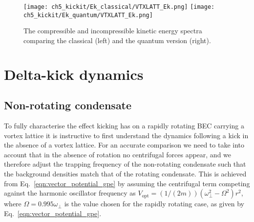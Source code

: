 \begin{figure}
    \centering
    \texttt{[image: ch5\_kickit/Ek\_classical/VTXLATT\_Ek.png]}
    \texttt{[image: ch5\_kickit/Ek\_quantum/VTXLATT\_Ek.png]}
\iffalse
    \texttt{[image: ch5\_kickit/Ek\_classical/VTXLATT\_Comp.png]}
    \texttt{[image: ch5\_kickit/Ek\_quantum/VTXLATT\_Comp.png]}

    \texttt{[image: ch5\_kickit/Ek\_classical/VTXLATT\_Incomp.png]}
    \texttt{[image: ch5\_kickit/Ek\_quantum/VTXLATT\_Incomp.png]}

    \caption[Kinetic energy spectra with and without quantum phase.]{The kinetic energy spectra (top row), compressible (middle row), and incompressible energies (bottom row), comparing the classical (left) and the quantum version (right). The inclusion of the phase term eliminates the peaks from the compressible energy, yet yields a more accurate representation of the magnitude of both energies (see text).}
\fi
\caption[Kinetic energy spectra with and without quantum phase.]{The compressible and incompressible kinetic energy spectra comparing the classical (left) and the quantum version (right).}
\label{fig:ek_clvqu}
\end{figure}


\section{Delta-kick dynamics}\label{sec:kickvl}
\subsection{Non-rotating condensate}
To fully characterise the effect kicking has on a rapidly rotating BEC carrying a vortex lattice it is instructive to first understand the dynamics following a kick in the absence of a vortex lattice. For an accurate comparison we need to take into account that in the absence of rotation no centrifugal forces appear, and we therefore adjust the trapping frequency of the non-rotating condensate such that the background densities match that of the rotating condensate. This is achieved from Eq.~\eqref{eqn:vector_potential_gpe} by assuming the centrifugal term competing against the harmonic oscillator frequency  as $V_{\text{opt}} = (1/(2m))(\omega^2_\perp - \Omega^2)
{r}^2$, where $\Omega=0.995\omega_\perp$ is the value chosen for the rapidly rotating case, as given by Eq.~\eqref{eqn:vector_potential_gpe}.

